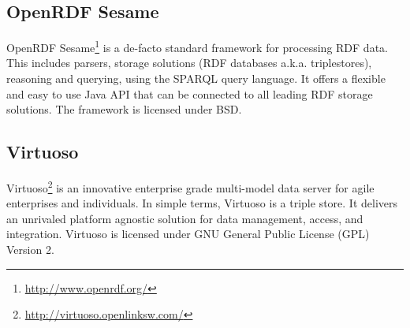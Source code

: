 \subsection{OpenRDF Sesame}
\label{sec:Sesame}
OpenRDF Sesame\footnote{\url{http://www.openrdf.org/}} is  a de-facto standard framework for processing RDF data. 
This includes parsers, storage solutions (RDF databases a.k.a. triplestores), reasoning and querying, using the SPARQL query language. 
It offers a flexible and easy to use Java API that can be connected to all leading RDF storage solutions. 
The framework is licensed under BSD.


\subsection{Virtuoso}
\label{sec:Virtuoso}
Virtuoso\footnote{\url{http://virtuoso.openlinksw.com/}} is an innovative enterprise grade multi-model data server for agile enterprises and individuals.
In simple terms, Virtuoso is a triple store.
It delivers an unrivaled  platform agnostic solution for data management, access, and integration.
Virtuoso is licensed under GNU General Public License (GPL) Version 2.
